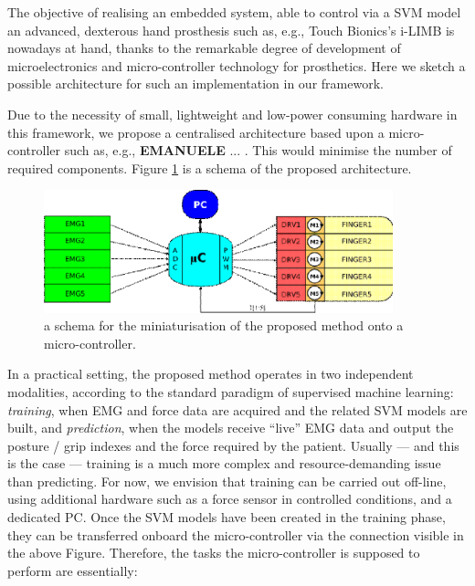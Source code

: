 The objective of realising an embedded system, able to control via a
SVM model an advanced, dexterous hand prosthesis such as, e.g., Touch
Bionics's i-LIMB is nowadays at hand, thanks to the remarkable degree
of development of microelectronics and micro-controller technology for
prosthetics. Here we sketch a possible architecture for such an
implementation in our framework.

Due to the necessity of small, lightweight and low-power consuming
hardware in this framework, we propose a centralised architecture
based upon a micro-controller such as, e.g., \textbf{EMANUELE}
... \cite{...}. This would minimise the number of required
components. Figure \ref{fig:mc} is a schema of the proposed
architecture.

\begin{figure}[!ht] \centering
  \includegraphics[width=0.9\textwidth]{figs/mc}
  \caption{a schema for the miniaturisation of the proposed method
    onto a micro-controller.}
  \label{fig:mc}
\end{figure}

In a practical setting, the proposed method operates in two
independent modalities, according to the standard paradigm of
supervised machine learning: \emph{training}, when EMG and force data
are acquired and the related SVM models are built, and
\emph{prediction}, when the models receive ``live'' EMG data and
output the posture / grip indexes and the force required by the
patient. Usually --- and this is the case --- training is a much more
complex and resource-demanding issue than predicting. For now, we
envision that training can be carried out off-line, using additional
hardware such as a force sensor in controlled conditions, and a
dedicated PC. Once the SVM models have been created in the training
phase, they can be transferred onboard the micro-controller via the
connection visible in the above Figure. Therefore, the tasks the
micro-controller is supposed to perform are essentially:

